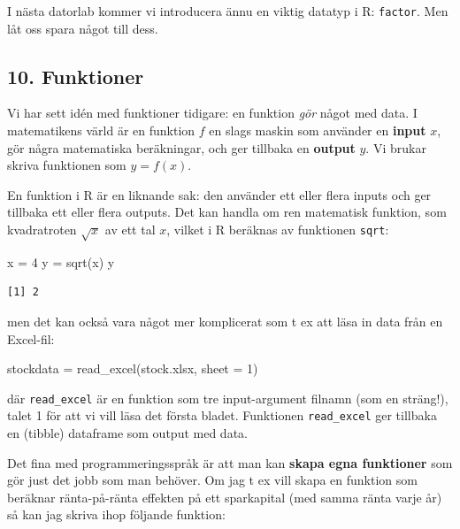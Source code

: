 \documentclass[
  letterpaper,
  DIV=11,
  numbers=noendperiod,
  oneside]{scrartcl}
\newenvironment{Shaded}{\begin{snugshade}}{\end{snugshade}}
\newcommand{\AttributeTok}[1]{\textcolor[rgb]{0.40,0.45,0.13}{#1}}
\newcommand{\DecValTok}[1]{\textcolor[rgb]{0.68,0.00,0.00}{#1}}
\newcommand{\FunctionTok}[1]{\textcolor[rgb]{0.28,0.35,0.67}{#1}}
\newcommand{\NormalTok}[1]{\textcolor[rgb]{0.00,0.23,0.31}{#1}}
\newcommand{\OtherTok}[1]{\textcolor[rgb]{0.00,0.23,0.31}{#1}}
\newcommand{\StringTok}[1]{\textcolor[rgb]{0.13,0.47,0.30}{#1}}
\begin{document}
I nästa datorlab kommer vi introducera ännu en viktig datatyp i R:
\texttt{factor}. Men låt oss spara något till dess.

\hypertarget{funktioner}{%
\subsection{10. Funktioner}\label{funktioner}}

Vi har sett idén med funktioner tidigare: en funktion \emph{gör} något
med data. I matematikens värld är en funktion \(f\) en slags maskin som
använder en \textbf{input} \(x\), gör några matematiska beräkningar, och
ger tillbaka en \textbf{output} \(y\). Vi brukar skriva funktionen som
\(y=f(x)\).

En funktion i R är en liknande sak: den använder ett eller flera inputs
och ger tillbaka ett eller flera outputs. Det kan handla om ren
matematisk funktion, som kvadratroten \(\sqrt{x}\) av ett tal \(x\),
vilket i R beräknas av funktionen \texttt{sqrt}:

\begin{Shaded}
\begin{Highlighting}[]
\NormalTok{x }\OtherTok{=} \DecValTok{4}
\NormalTok{y }\OtherTok{=} \FunctionTok{sqrt}\NormalTok{(x)}
\NormalTok{y}
\end{Highlighting}
\end{Shaded}

\begin{verbatim}
[1] 2
\end{verbatim}

men det kan också vara något mer komplicerat som t ex att läsa in data
från en Excel-fil:

\begin{Shaded}
\begin{Highlighting}[]
\NormalTok{stockdata }\OtherTok{=} \FunctionTok{read\_excel}\NormalTok{(}\StringTok{\textquotesingle{}stock.xlsx\textquotesingle{}}\NormalTok{, }\AttributeTok{sheet =} \DecValTok{1}\NormalTok{)}
\end{Highlighting}
\end{Shaded}

där \texttt{read\_excel} är en funktion som tre input-argument filnamn
(som en sträng!), talet 1 för att vi vill läsa det första bladet.
Funktionen \texttt{read\_excel} ger tillbaka en (tibble) dataframe som
output med data.

Det fina med programmeringsspråk är att man kan \textbf{skapa egna
funktioner} som gör just det jobb som man behöver. Om jag t ex vill
skapa en funktion som beräknar ränta-på-ränta effekten på ett
sparkapital (med samma ränta varje år) så kan jag skriva ihop följande
funktion:
\end{document}
